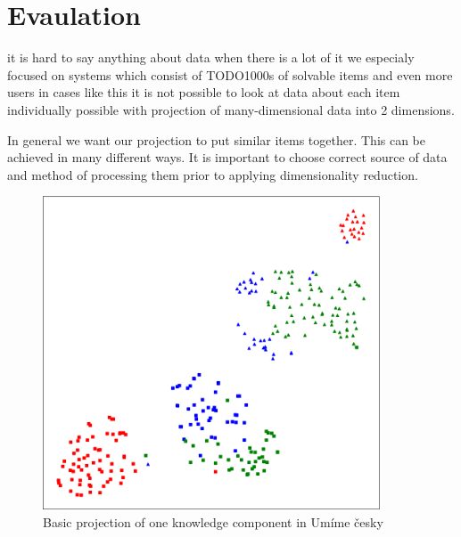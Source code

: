 \documentclass[
  digital, %
  table,   %
  nolof,     %
  nolot,     %
  nocover
]{fithesis3}
\begin{document}
\section{Evaulation}\label{evaulation}




it is hard to say anything about data when there is a lot of it we
especialy focused on systems which consist of TODO1000s of solvable
items and even more users in cases like this it is not possible to look
at data about each item individually possible with projection of
many-dimensional data into 2 dimensions.


In general we want our projection to put similar items together. This
can be achieved in many different ways. It is important to choose
correct source of data and method of processing them prior to applying
dimensionality reduction.


\begin{figure}
  \begin{center}
    \includegraphics[width=10cm]{img/common_projection}
  \end{center}
  \caption{Basic projection of one knowledge component in Umíme česky}
  \label{fig:commonprojection}
\end{figure}
\end{document}
